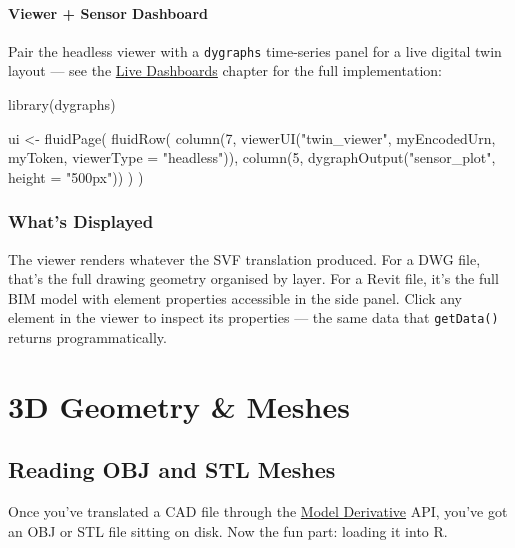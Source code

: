 \documentclass[
  11pt,
  letterpaper,
  DIV=11,
  numbers=noendperiod]{scrreprt}
\newenvironment{Shaded}{\begin{snugshade}}{\end{snugshade}}
\newcommand{\AttributeTok}[1]{\textcolor[rgb]{0.40,0.45,0.13}{#1}}
\newcommand{\DecValTok}[1]{\textcolor[rgb]{0.68,0.00,0.00}{#1}}
\newcommand{\FunctionTok}[1]{\textcolor[rgb]{0.28,0.35,0.67}{#1}}
\newcommand{\NormalTok}[1]{\textcolor[rgb]{0.00,0.23,0.31}{#1}}
\newcommand{\OtherTok}[1]{\textcolor[rgb]{0.00,0.23,0.31}{#1}}
\newcommand{\StringTok}[1]{\textcolor[rgb]{0.13,0.47,0.30}{#1}}
\begin{document}
\subsection{Viewer + Sensor Dashboard}\label{viewer-sensor-dashboard}

Pair the headless viewer with a \texttt{dygraphs} time-series panel for
a live digital twin layout --- see the \href{live-dashboards.qmd}{Live
Dashboards} chapter for the full implementation:

\begin{Shaded}
\begin{Highlighting}[]
\FunctionTok{library}\NormalTok{(dygraphs)}

\NormalTok{ui }\OtherTok{\textless{}{-}} \FunctionTok{fluidPage}\NormalTok{(}
  \FunctionTok{fluidRow}\NormalTok{(}
    \FunctionTok{column}\NormalTok{(}\DecValTok{7}\NormalTok{, }\FunctionTok{viewerUI}\NormalTok{(}\StringTok{"twin\_viewer"}\NormalTok{, myEncodedUrn, myToken, }\AttributeTok{viewerType =} \StringTok{"headless"}\NormalTok{)),}
    \FunctionTok{column}\NormalTok{(}\DecValTok{5}\NormalTok{, }\FunctionTok{dygraphOutput}\NormalTok{(}\StringTok{"sensor\_plot"}\NormalTok{, }\AttributeTok{height =} \StringTok{"500px"}\NormalTok{))}
\NormalTok{  )}
\NormalTok{)}
\end{Highlighting}
\end{Shaded}

\section{What's Displayed}\label{whats-displayed}

The viewer renders whatever the SVF translation produced. For a DWG
file, that's the full drawing geometry organised by layer. For a Revit
file, it's the full BIM model with element properties accessible in the
side panel. Click any element in the viewer to inspect its properties
--- the same data that \texttt{getData()} returns programmatically.

\part{3D Geometry \& Meshes}

\chapter{Reading OBJ and STL Meshes}\label{reading-obj-and-stl-meshes}

Once you've translated a CAD file through the
\hyperref[model-derivative]{Model Derivative} API, you've got an OBJ or
STL file sitting on disk. Now the fun part: loading it into R.
\end{document}

